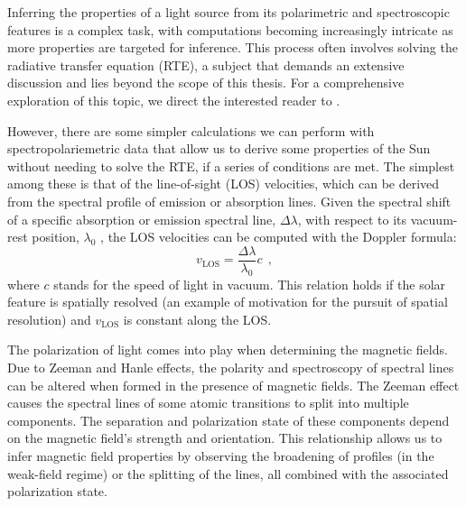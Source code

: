 Inferring the properties of a light source from its polarimetric and spectroscopic features is a complex task, with computations becoming increasingly intricate as more properties are targeted for inference. This process often involves solving the radiative transfer equation (RTE), a subject that demands an extensive discussion and lies beyond the scope of this thesis. For a comprehensive exploration of this topic, we direct the interested reader to \cite{del2016inversion}.

However, there are some simpler calculations we can perform with spectropolariemetric data that allow us to derive some properties of the Sun without needing to solve the RTE, if a series of conditions are met. The simplest among these is that of the line-of-sight (LOS) velocities, which can be derived from the spectral profile of emission or absorption lines. Given the spectral shift of a specific absorption or emission spectral line, $\Delta \lambda$, with respect to its vacuum-rest position, $\lambda _ 0$ , the LOS velocities can be computed with the Doppler formula: 
\begin{equation}
  v_{\text{LOS}} = \frac{\Delta \lambda}{\lambda _ 0}c\ \ ,
  \label{eq_spectro: Doppler}
\end{equation}
where $c$ stands for the speed of light in vacuum. This relation holds if the solar feature is spatially resolved (an example of motivation for the pursuit of spatial resolution) and $v_{\text{LOS}}$ is constant along the LOS. 

The polarization of light comes into play when determining the magnetic fields. Due to Zeeman and Hanle effects, the polarity and spectroscopy of spectral lines can be altered when formed in the presence of magnetic fields. The Zeeman effect causes the spectral lines of some atomic transitions to split into multiple components. The separation and polarization state of these components depend  on the magnetic field's strength and orientation. This relationship allows us to infer magnetic field properties by observing the broadening of profiles (in the weak-field regime) or the splitting of the lines, all combined with the associated polarization state.

